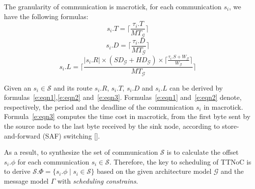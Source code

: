 \documentclass[jornal]{IEEEtran}
\newcommand{\calG}{\mathcal{G}}
\newcommand{\calS}{\mathcal{S}}
\newcommand{\width}{\mathit{W}_\calG}
\newcommand{\SD}{\mathit{SD}_\calG}
\newcommand{\HD}{\mathit{HD}_\calG}
\newcommand{\MT}{\mathit{MT}_\calG}
\begin{document}

The granularity of communication is macrotick, for each communication
$s_{i}$, we have the following formulas:
\begin{equation}
\label{e:eqn1}
  s_i.T = \lceil\frac{\tau_{i}.T}{\MT} \rceil
\end{equation}
\begin{equation}
\label{e:eqn2}
  s_i.D = \lceil\frac{\tau_{i}.D}{\MT}\rceil
\end{equation}
\begin{equation}
\label{e:eqn3}
  s_i.L = \lceil\frac{|s_i.R| \times (\SD+\HD) \times
    \lceil\frac{\tau_{i}.S + \width}{\width}\rceil}{\MT}\rceil
\end{equation}

Given an $s_{i}\in\calS$ and its route $s_i.R$, $s_i.T$, $s_i.D$ and
$s_i.L$ can be derived by formulas~\ref{e:eqn1},\ref{e:eqn2}
and~\ref{e:eqn3}.  Formulas~\ref{e:eqn1} and~\ref{e:eqn2} denote,
respectively, the period and the deadline of the communication $s_i$
in macrotick. Formula~\ref{e:eqn3} computes the time cost in
macrotick, from the first byte sent by the source node to the last
byte received by the sink node, according to store-and-forward (SAF)
switching []. 

As a result, to synthesize the set of communication $\calS$ is to
calculate the offset $s_i.\phi$ for each communication
$s_i\in\calS$. Therefore, the key to scheduling of TTNoC is to derive
$\calS.\Phi = \{s_i.\phi\mid s_i\in\calS\}$ based on the given
architecture model $\calG$ and the message model $\Gamma$ with
\emph{scheduling constrains}.
\end{document}
